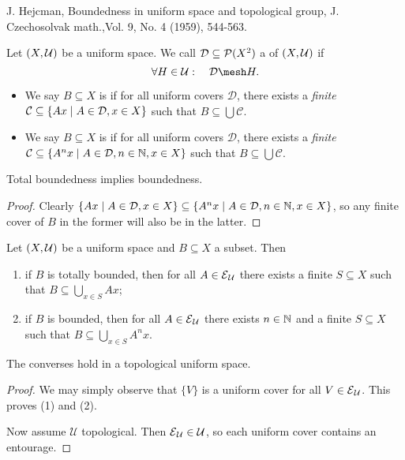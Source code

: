 J. Hejcman, Boundedness in uniform space and topological group, J. Czechosolvak
math.,Vol. 9, No. 4 (1959), 544-563.

\begin{definition}
Let $\sSet{X,\mathcal{U}}$ be a uniform space. We call $\mathcal{D} \subseteq \operatorname{\mathcal{P}}(X^2)$ a  of $\sSet{X,\mathcal{U}}$ if
\[ \forall H\in \mathcal{U}:\quad \mathcal{D}\mesh H. \]
\begin{itemize}
\item We say $B\subseteq X$ is  if for all uniform covers $\mathcal{D}$, there exists a \emph{finite} $\mathcal{C} \subseteq \setbuilder{Ax}{A\in \mathcal{D}, x\in X}$ such that $B\subseteq \bigcup \mathcal{C}$.
\item We say $B\subseteq X$ is  if for all uniform covers $\mathcal{D}$, there exists a \emph{finite} $\mathcal{C} \subseteq \setbuilder{A^nx}{A\in \mathcal{D}, n\in \N, x\in X}$ such that $B\subseteq \bigcup \mathcal{C}$.
\end{itemize}
\end{definition}

\begin{lemma} \label{totalBoundednessImpliesBoundedness}
Total boundedness implies boundedness.
\end{lemma}
\begin{proof}
Clearly $\setbuilder{Ax}{A\in \mathcal{D}, x\in X} \subseteq \setbuilder{A^nx}{A\in \mathcal{D}, n\in \N, x\in X}$, so any finite cover of $B$ in the former will also be in the latter.
\end{proof}

\begin{lemma} \label{topologicalBoundednessLemma}
Let $\sSet{X,\mathcal{U}}$ be a uniform space and $B\subseteq X$ a subset. Then
\begin{enumerate}
\item if $B$ is totally bounded, then for all $A\in \operatorname{\mathcal{E}}_\mathcal{U}$ there exists a finite $S\subseteq X$ such that $B\subseteq \bigcup_{x\in S}Ax$;
\item if $B$ is bounded, then for all $A\in \operatorname{\mathcal{E}}_\mathcal{U}$ there exists $n\in \mathbb{N}$ and a finite $S\subseteq X$ such that $B\subseteq \bigcup_{x\in S}A^nx$.
\end{enumerate}
The converses hold in a topological uniform space.
\end{lemma}
\begin{proof}
We may simply observe that $\{V\}$ is a uniform cover for all $V\in \operatorname{\mathcal{E}}_\mathcal{U}$. This proves (1) and (2).

Now assume $\mathcal{U}$ topological. Then $\operatorname{\mathcal{E}}_\mathcal{U} \in \mathcal{U}$, so each uniform cover contains an entourage. 
\end{proof}

